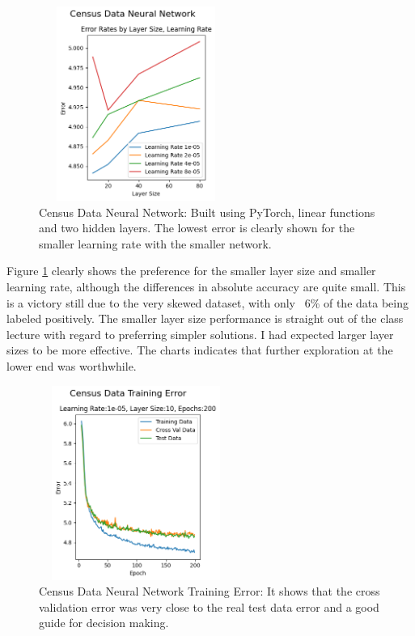 \documentclass[letterpaper]{article} %
\begin{document}
\begin{figure}[h]
\centering
\includegraphics[width=2.5in, height=2.5in]{figures/Census_Data_Neural_Network_Error_Rates_by_Layer_Size__Learning_Rate_census.png}
\caption{Census Data Neural Network:  Built using PyTorch, linear functions and two hidden layers.  The lowest error is clearly shown for the smaller learning rate with the smaller network.   }
\label{fig:census_neural_network_start}
\end{figure}

Figure \ref{fig:census_neural_network_start} clearly shows the preference for the smaller layer size and smaller learning rate, although the differences in absolute accuracy are quite small.  This is a victory still due to the very skewed dataset, with only ~6\% of the data being labeled positively.  The smaller layer size performance is straight out of the class lecture with regard to preferring simpler solutions.  I had expected larger layer sizes to be more effective.  The charts indicates that further exploration at the lower end was worthwhile.

\begin{figure}[h]
\centering
\includegraphics[width=2.5in, height=2.5in]{figures/Census_Data_Training_Error_Learning_Rate_chart_one.png}
\caption{Census Data Neural Network Training Error:  It shows that the cross validation error was very close to the real test data error and a good guide for decision making.  }
\label{fig:census_neural_network_error}
\end{figure}
\end{document}
